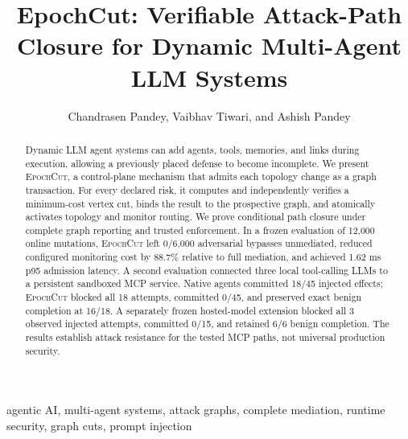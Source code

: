 \documentclass[10pt,journal,compsoc]{IEEEtran}
\newcommand{\system}{\textsc{EpochCut}}
\begin{document}
\title{EpochCut: Verifiable Attack-Path Closure for Dynamic Multi-Agent LLM Systems}

\author{Chandrasen Pandey, Vaibhav Tiwari, and Ashish Pandey%
}

\maketitle

\begin{abstract}
Dynamic LLM agent systems can add agents, tools, memories, and links during
execution, allowing a previously placed defense to become incomplete.  We
present \system, a control-plane mechanism that admits each topology change as
a graph transaction.  For every declared risk, it computes and independently
verifies a minimum-cost vertex cut, binds the result to the prospective graph,
and atomically activates topology and monitor routing.  We prove conditional
path closure under complete graph reporting and trusted enforcement.  In a
frozen evaluation of 12,000 online mutations, \system{} left 0/6,000
adversarial bypasses unmediated, reduced configured monitoring cost by 88.7\%
relative to full mediation, and achieved 1.62 ms p95 admission latency.  A
second evaluation connected three local tool-calling LLMs to a persistent
sandboxed MCP service.  Native agents committed 18/45 injected effects;
\system{} blocked all 18 attempts, committed 0/45, and preserved exact benign
completion at 16/18.  A separately frozen hosted-model extension blocked all
3 observed injected attempts, committed 0/15, and retained 6/6 benign
completion.  The results establish attack resistance for the tested MCP paths,
not universal production security.
\end{abstract}

\begin{IEEEkeywords}
agentic AI, multi-agent systems, attack graphs, complete mediation, runtime
security, graph cuts, prompt injection
\end{IEEEkeywords}
\end{document}
